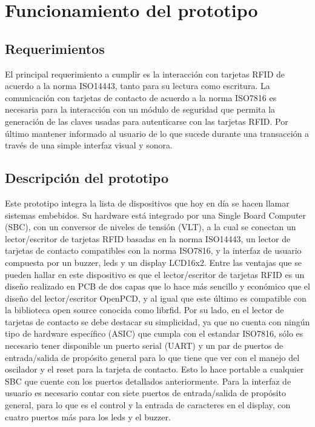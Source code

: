 \chapter{Funcionamiento del prototipo}

\section{Requerimientos}
El principal requerimiento a cumplir es la interacción con tarjetas RFID de acuerdo a la norma ISO14443, tanto para su lectura como escritura.
La comunicación con tarjetas de contacto de acuerdo a la norma ISO7816 es necesaria para la interacción con
un módulo de seguridad que permita la generación de las claves usadas para autenticarse
con las tarjetas RFID.
Por último mantener informado al usuario de lo que sucede durante una transacción
a través de una simple interfaz visual y sonora.


\section{Descripción del prototipo}
Este prototipo integra la lista de dispositivos que hoy en día se hacen llamar sistemas embebidos. Su hardware está integrado por una Single Board Computer (SBC), con un conversor de niveles de tensión (VLT), a la cual se conectan un lector/escritor de tarjetas RFID basadas en la norma ISO14443, un lector de tarjetas de contacto compatibles con la norma ISO7816, y la interfaz de usuario compuesta por un buzzer, leds y un display LCD16x2.
Entre las ventajas que se pueden hallar en este dispositivo es que el lector/escritor de tarjetas RFID es un diseño realizado en PCB de dos capas que lo hace más sencillo y económico que el diseño del lector/escritor OpenPCD, y al igual que este último es compatible con la biblioteca open source conocida como librfid.
Por su lado, en el lector de tarjetas de contacto se debe destacar su simplicidad, ya que no cuenta con ningún tipo de hardware específico (ASIC) que cumpla con el estandar ISO7816, sólo es necesario tener disponible un puerto serial (UART) y un par de puertos de entrada/salida de propósito general para lo que tiene que ver con el manejo del oscilador y el reset para la tarjeta de contacto. Esto lo hace portable a cualquier SBC que cuente con los puertos detallados anteriormente.
Para la interfaz de usuario es necesario contar con siete puertos de entrada/salida de propósito general, para lo que es el control y la entrada de caracteres en el display, con cuatro puertos más para los leds y el buzzer.


